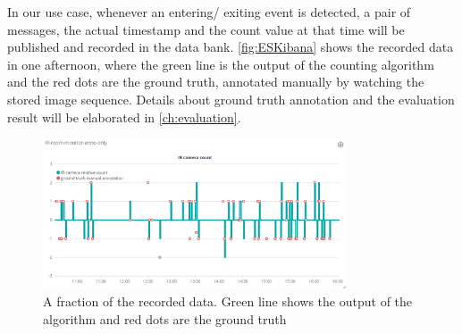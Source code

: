 In our use case, whenever an entering/ exiting event is detected, a pair of messages, the actual timestamp and the count value at that time will be published and recorded in the data bank. \autoref{fig:ESKibana} shows the recorded data in one afternoon, where the green line is the output of the counting algorithm and the red dots are the ground truth, annotated manually by watching the stored image sequence. Details about ground truth annotation and the evaluation result will be elaborated in \autoref{ch:evaluation}.
\begin{figure}
  \centering
  \includegraphics[width=0.8\textwidth]{figures/ESKibana_overview.PNG}
  \caption{A fraction of the recorded data. Green line shows the output of the algorithm and red dots are the ground truth}\label{fig:ESKibana}
\end{figure}


  